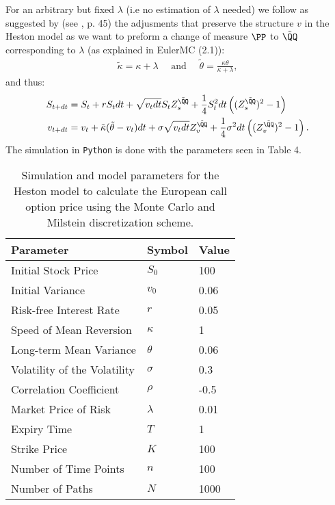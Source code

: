 \documentclass[11pt]{article}
\numberwithin{equation}{section}
\begin{document}
For an arbitrary but fixed $\lambda$ (i.e no estimation of $\lambda$ needed) we
follow as suggested by \cite{heston1993closed} (see \cite{Havrylenko2024}, p.
45) the adjusments that preserve the structure $v$ in the Heston model as we
want to preform a change of measure $\PP$ to $\tilde{\QQ}$ corresponding to
$\lambda$ (as
explained in EulerMC (2.1)):
\begin{align*}
    \tilde{\kappa}=\kappa+\lambda \quad \text{ and } \quad \tilde{\theta}=\frac{\kappa\theta}{\kappa + \lambda},
\end{align*}
and thus:
\begin{align*}
    S_{t+dt} &= S_t + rS_tdt + \sqrt{v_t dt}S_tZ_s^{\tilde{\QQ}}+\frac{1}{4}S_t^2dt\left ((Z_s^{{\tilde{\QQ}}})^2-1 \right )\\
    v_{t+dt} &= v_t +\tilde{\kappa}(\tilde{\theta} - v_t)dt + \sigma \sqrt{v_tdt}Z_v^{\tilde{\QQ}}+\frac{1}{4}\sigma^2dt\left ((Z_v^{\tilde{\QQ}})^2-1 \right ).
\end{align*}
The simulation in \texttt{Python} is done with the parameters seen in Table 4.
\begin{table}[!h]
    \centering
    \begin{tabular}{lll}
    \toprule
    \textbf{Parameter} & \textbf{Symbol} & \textbf{Value} \\
    \midrule
    Initial Stock Price & $S_0$ & 100 \\
    Initial Variance & $v_0$ & 0.06 \\
    Risk-free Interest Rate & $r$ & 0.05 \\
    Speed of Mean Reversion & $\kappa$ & 1 \\
    Long-term Mean Variance & $\theta$ & 0.06 \\
    Volatility of the Volatility & $\sigma$ & 0.3 \\
    Correlation Coefficient & $\rho$ & -0.5 \\
    Market Price of Risk & $\lambda$ & 0.01 \\
    Expiry Time & $T$ & 1 \\
    Strike Price & $K$ & 100 \\
    Number of Time Points & $n$ & 100 \\
    Number of Paths & $N$ & 1000 \\
    \bottomrule
    \end{tabular}
    \caption{Simulation and model parameters for the Heston model to calculate the European call option price using the Monte Carlo and Milstein discretization scheme.}
    \label{table:call_option_pricing_parameters2}
    \end{table}
\end{document}
